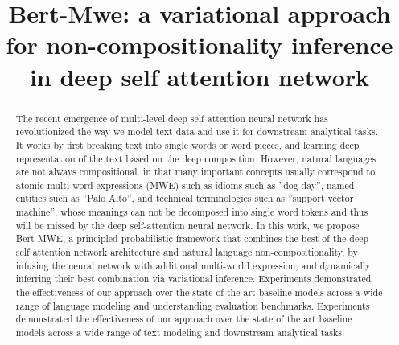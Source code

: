 \documentclass[conference]{IEEEtran}
\newcommand{\nop}[1]{}
\newcommand{\BertMWE}{\mbox{\sf Bert-MWE}\xspace}
\begin{document}
\title{
Bert-Mwe: a variational approach for non-compositionality inference in deep self attention network
}

\nop{
\author{Keqian Li}
\affiliation{\institution{University of California at Santa Barbara}}
\email{{klee}@cs.ucsb.edu}

\renewcommand{\shortauthors}{K. Li et al.}
\renewcommand{\shorttitle}{UNEC}
}

\author{
}

\maketitle




\begin{abstract}
The recent emergence of multi-level deep self attention neural network has revolutionized the way we model text data and use it for downstream analytical tasks. 
It works by first breaking text into single words or word pieces, 
and learning deep representation of the text based on the deep composition.
However, natural languages are not always compositional.
in that many important concepts usually correspond to atomic multi-word  expressions (MWE) such as 
idioms such as ”dog day”, named entities such as ”Palo Alto”, and technical terminologies such as ”support vector machine”,
whose meanings can not be decomposed into single word tokens and thus will be missed by the deep self-attention neural network.
In this work, we propose \BertMWE, a  principled probabilistic framework that combines the best of the deep self attention network architecture and natural language non-compositionality, 
by infusing the neural network with additional multi-world expression, and dynamically inferring their best combination via variational inference. Experiments demonstrated the effectiveness of our approach over the state of the art baseline models across a wide range of language modeling and understanding evaluation benchmarks. 
Experiments demonstrated the effectiveness of our approach over the state of the art baseline models across a wide range of text modeling and downstream analytical tasks.
\end{abstract}







\end{document}
